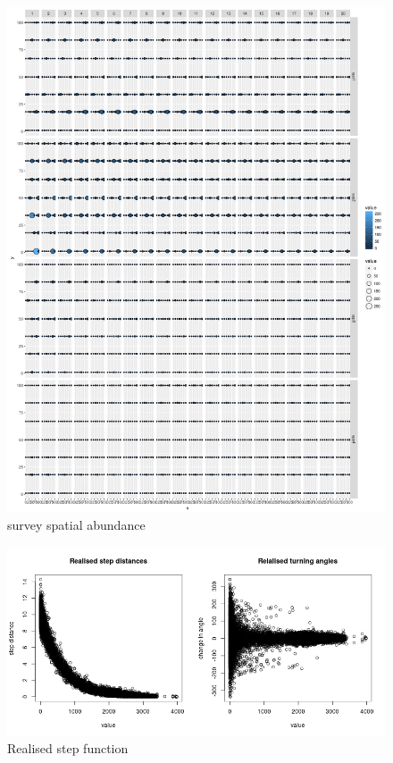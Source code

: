 \documentclass[review]{elsarticle}
\begin{document}
\begin{figure}[!ht]
	\includegraphics[width = \linewidth]{../tests/plots/spatial_survey}
		\caption{survey spatial abundance}
\end{figure}	

\begin{figure}[!ht]
	\includegraphics[width = \linewidth]{../tests/plots/step_function}
		\caption{Realised step function}
\end{figure}	
\end{document}
